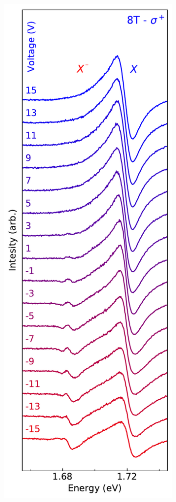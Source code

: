 \begin{figure}[t]
\begin{subfigure}{0.32\textwidth}
	\end{subfigure}
	\begin{subfigure}{0.32\textwidth}
		\caption{}
		\includegraphics[width=\textwidth]{waterfall_8TRF_sp}

\end{subfigure}
\end{figure}
